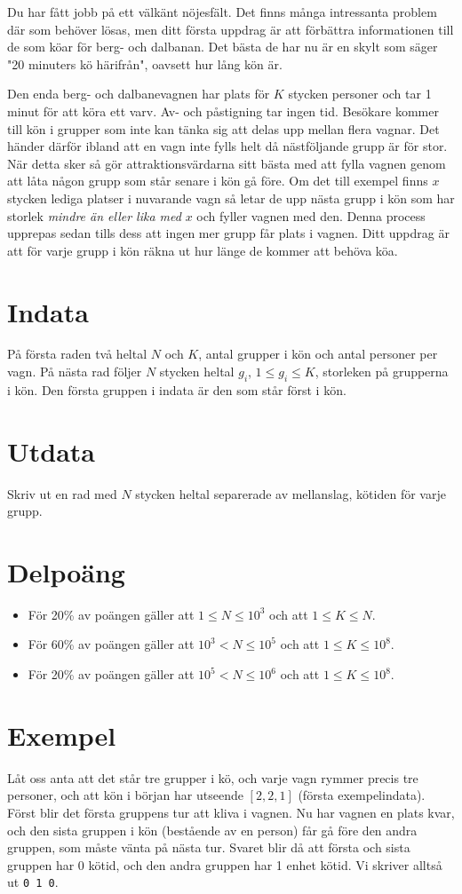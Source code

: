 Du har fått jobb på ett välkänt nöjesfält. Det finns många intressanta problem där som behöver lösas, men ditt första uppdrag är att förbättra informationen till de som köar för berg- och dalbanan. Det bästa de har nu är en skylt som säger "20 minuters kö härifrån", oavsett hur lång kön är.

Den enda berg- och dalbanevagnen har plats för $K$ stycken personer och tar 1 minut för att köra ett varv. Av- och påstigning tar ingen tid. Besökare kommer till kön i grupper som inte kan tänka sig att delas upp mellan flera vagnar. Det händer därför ibland att en vagn inte fylls helt då nästföljande grupp är för stor. När detta sker så gör attraktionsvärdarna sitt bästa med att fylla vagnen genom att låta någon grupp som står senare i kön gå före. Om det till exempel finns $x$ stycken lediga platser i nuvarande vagn så letar de upp nästa grupp i kön som har storlek \emph{mindre än eller lika med} $x$ och fyller vagnen med den. Denna process upprepas sedan tills dess att ingen mer grupp får plats i vagnen. Ditt uppdrag är att för varje grupp i kön räkna ut hur länge de kommer att behöva köa.

\section*{Indata}
På första raden två heltal $N$ och $K$, antal grupper i kön och antal personer per vagn. På nästa rad följer $N$ stycken heltal $g_i$, $1 \leq g_i \leq K$, storleken på grupperna i kön. Den första gruppen i indata är den som står först i kön.

\section*{Utdata}
Skriv ut en rad med $N$ stycken heltal separerade av mellanslag, kötiden för varje grupp.

\section*{Delpoäng}
\begin{itemize}
\item För 20\% av poängen gäller att $1 \leq N \leq 10^3$ och att $1 \leq K \leq N$.
\item För 60\% av poängen gäller att $10^3 < N \leq 10^{5}$ och att $1 \leq K \leq 10^8$.
\item För 20\% av poängen gäller att $10^5 < N \leq 10^6$ och att $1 \leq K \leq 10^8$.
\end{itemize}

\section*{Exempel}
Låt oss anta att det står tre grupper i kö, och varje vagn rymmer precis tre personer, och att kön i början har utseende $[2,2,1]$ (första exempelindata). Först blir det första gruppens tur att kliva i vagnen. Nu har vagnen en plats kvar, och den sista gruppen i kön (bestående av en person) får gå före den andra gruppen, som måste vänta på nästa tur. Svaret blir då att första och sista gruppen har 0 kötid, och den andra gruppen har 1 enhet kötid. Vi skriver alltså ut \texttt{0 1 0}.
